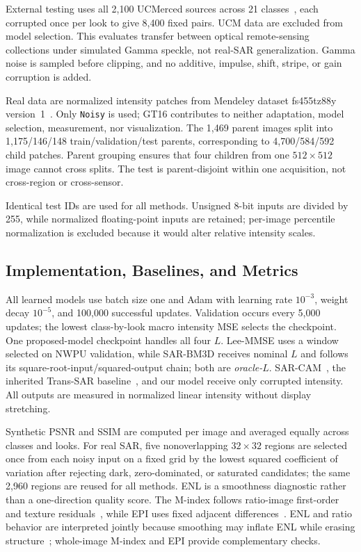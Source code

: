 \documentclass[conference]{IEEEtran}
\begin{document}
External testing uses all 2,100 UCMerced sources across 21 classes~\cite{yang2010}, each corrupted once per look to give 8,400 fixed pairs. UCM data are excluded from model selection. This evaluates transfer between optical remote-sensing collections under simulated Gamma speckle, not real-SAR generalization. Gamma noise is sampled before clipping, and no additive, impulse, shift, stripe, or gain corruption is added.

Real data are normalized intensity patches from Mendeley dataset fs455tz88y version~1~\cite{vasquez2024data}. Only \texttt{Noisy} is used; GT16 contributes to neither adaptation, model selection, measurement, nor visualization. The 1,469 parent images split into 1,175/146/148 train/validation/test parents, corresponding to 4,700/584/592 child patches. Parent grouping ensures that four children from one \(512\times512\) image cannot cross splits. The test is parent-disjoint within one acquisition, not cross-region or cross-sensor.

Identical test IDs are used for all methods. Unsigned 8-bit inputs are divided by 255, while normalized floating-point inputs are retained; per-image percentile normalization is excluded because it would alter relative intensity scales.

\subsection{Implementation, Baselines, and Metrics}
All learned models use batch size one and Adam with learning rate \(10^{-3}\), weight decay \(10^{-5}\), and 100,000 successful updates. Validation occurs every 5,000 updates; the lowest class-by-look macro intensity MSE selects the checkpoint. One proposed-model checkpoint handles all four \(L\). Lee-MMSE uses a window selected on NWPU validation, while SAR-BM3D receives nominal \(L\) and follows its square-root-input/squared-output chain; both are \emph{oracle-\(L\)}. SAR-CAM~\cite{ko2022}, the inherited Trans-SAR baseline~\cite{perera2022}, and our model receive only corrupted intensity. All outputs are measured in normalized linear intensity without display stretching.

Synthetic PSNR and SSIM are computed per image and averaged equally across classes and looks. For real SAR, five nonoverlapping \(32\times32\) regions are selected once from each noisy input on a fixed grid by the lowest squared coefficient of variation after rejecting dark, zero-dominated, or saturated candidates; the same 2,960 regions are reused for all methods. ENL is a smoothness diagnostic rather than a one-direction quality score. The M-index follows ratio-image first-order and texture residuals~\cite{gomez2017}, while EPI uses fixed adjacent differences~\cite{ma2024epi}. ENL and ratio behavior are interpreted jointly because smoothing may inflate ENL while erasing structure~\cite{vasquez2025ratio}; whole-image M-index and EPI provide complementary checks.
\end{document}
